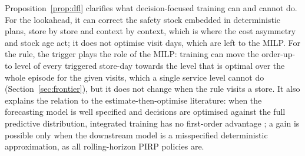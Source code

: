Proposition~\ref{prop:dfl} clarifies what decision-focused training can and cannot do. For the lookahead, it can correct the safety stock embedded in deterministic plans, store by store and context by context, which is where the cost asymmetry and stock age act; it does not optimise visit days, which are left to the MILP. For the rule, the trigger plays the role of the MILP: training can move the order-up-to level of every triggered store-day towards the level that is optimal over the whole episode for the given visits, which a single service level cannot do (Section~\ref{sec:frontier}), but it does not change when the rule visits a store. It also explains the relation to the estimate-then-optimise literature: when the forecasting model is well specified and decisions are optimised against the full predictive distribution, integrated training has no first-order advantage \citep{hu2022fast,elmachtoub2023estimate}; a gain is possible only when the downstream model is a misspecified deterministic approximation, as all rolling-horizon PIRP policies are.
